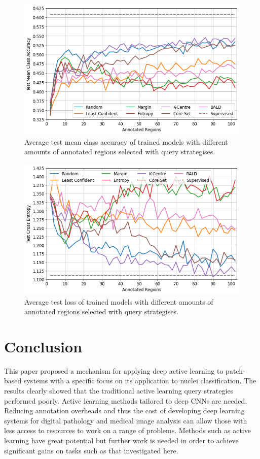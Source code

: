 \begin{figure}
	\centering
	\includegraphics[width=\textwidth]{images/active_learning_mean_class_accuracy.png}
	\caption{Average test mean class accuracy of trained models with different amounts of annotated regions selected with query strategises.}
	\label{fig:active_learning_mean_class_accuracy}
\end{figure}

\begin{figure}
	\centering
	\includegraphics[width=\textwidth]{images/active_learning_loss.png}
	\caption{Average test loss of trained models with different amounts of annotated regions selected with query strategises.}
	\label{fig:active_learning_loss}
\end{figure}


\section{Conclusion}
This paper proposed a mechanism for applying deep active learning to patch-based systems with a specific focus on its application to nuclei classification. The results clearly showed that the traditional active learning query strategies performed poorly. Active learning methods tailored to deep CNNs are needed. Reducing annotation overheads and thus the cost of developing deep learning systems for digital pathology and medical image analysis can allow those with less access to resources to work on a range of problems. Methods such as active learning have great potential but further work is needed in order to achieve significant gains on tasks such as that investigated here. 
